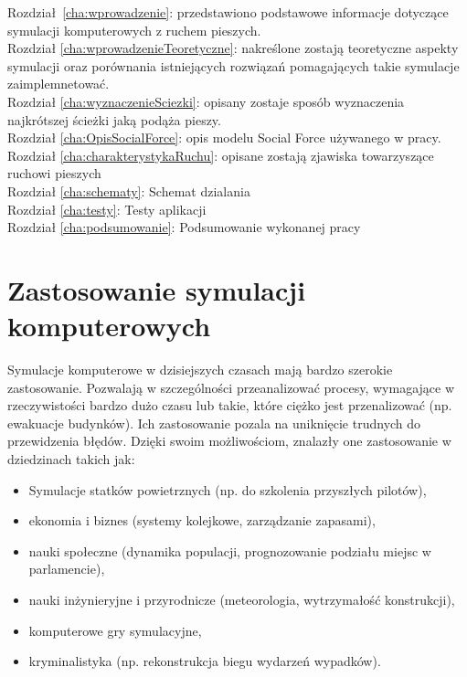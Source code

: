 Rozdział~\ref{cha:wprowadzenie}: przedstawiono podstawowe informacje dotyczące symulacji komputerowych z ruchem pieszych. \\
Rozdział \ref{cha:wprowadzenieTeoretyczne}: nakreślone zostają teoretyczne aspekty symulacji oraz porównania istniejących rozwiązań pomagających takie symulacje zaimplemnetować. \\
Rozdział \ref{cha:wyznaczenieSciezki}: opisany zostaje sposób wyznaczenia najkrótszej ścieżki jaką podąża pieszy. \\
Rozdział \ref{cha:OpisSocialForce}: opis modelu Social Force używanego w pracy. \\
Rozdział \ref{cha:charakterystykaRuchu}: opisane zostają zjawiska towarzyszące ruchowi pieszych \\
Rozdział \ref{cha:schematy}: Schemat dzialania \\
Rozdział \ref{cha:testy}: Testy aplikacji \\
Rozdział \ref{cha:podsumowanie}: Podsumowanie wykonanej pracy \\


\section{Zastosowanie symulacji komputerowych}
\label{sec:ZastosowanieSymulacji}

Symulacje komputerowe w dzisiejszych czasach mają bardzo szerokie zastosowanie. Pozwalają w szczególności przeanalizować procesy, wymagające w rzeczywistości bardzo dużo czasu lub takie, które ciężko jest przenalizować (np. ewakuacje budynków). Ich zastosowanie pozala na uniknięcie trudnych do przewidzenia błędów. Dzięki swoim możliwościom, znalazły one zastosowanie w dziedzinach takich jak:

\begin{itemize}
\item Symulacje statków powietrznych (np. do szkolenia przyszłych pilotów),
\item ekonomia i biznes (systemy kolejkowe, zarządzanie zapasami),
\item nauki społeczne (dynamika populacji, prognozowanie podziału miejsc w parlamencie),
\item nauki inżynieryjne i przyrodnicze (meteorologia, wytrzymałość konstrukcji),
\item komputerowe gry symulacyjne,
\item kryminalistyka (np. rekonstrukcja biegu wydarzeń wypadków).
\end{itemize}

